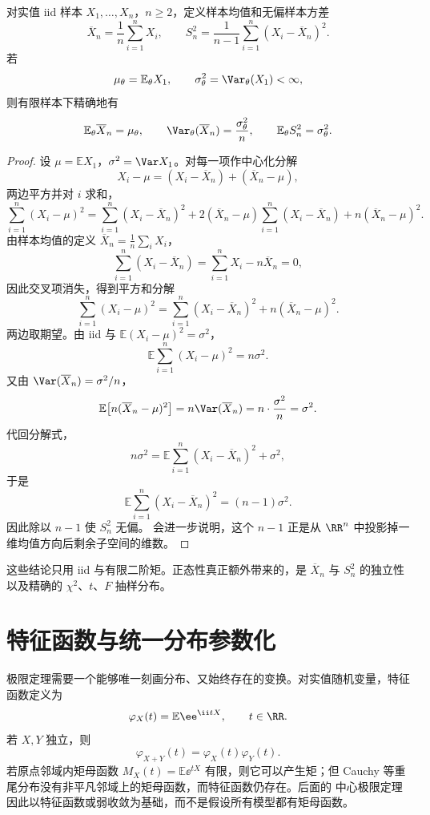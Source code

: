 \begin{proposition}[有限二阶矩下的样本矩无偏性]
对实值 iid 样本 $X_1,\ldots,X_n$，$n\ge2$，定义样本均值和无偏样本方差
\[
 \overline X_n=\frac1n\sum_{i=1}^nX_i,
 \qquad
 S_n^2=\frac1{n-1}\sum_{i=1}^n(X_i-\overline X_n)^2.
\]
若
\[
 \mu_\theta=\mathbb E_\theta X_1,
 \qquad
 \sigma_\theta^2=\Var_\theta(X_1)<\infty,
\]
则有限样本下精确地有
\[
 \mathbb E_\theta\overline X_n=\mu_\theta,
 \qquad
 \Var_\theta(\overline X_n)=\frac{\sigma_\theta^2}{n},
 \qquad
 \mathbb E_\theta S_n^2=\sigma_\theta^2.
\]

\end{proposition}
\begin{proof}
设 $\mu=\mathbb E X_1$，$\sigma^2=\Var X_1$。对每一项作中心化分解
\[
 X_i-\mu=(X_i-\overline X_n)+(\overline X_n-\mu),
\]
两边平方并对 $i$ 求和，
\[
 \sum_{i=1}^n(X_i-\mu)^2
 =\sum_{i=1}^n(X_i-\overline X_n)^2
 +2(\overline X_n-\mu)\sum_{i=1}^n(X_i-\overline X_n)
 +n(\overline X_n-\mu)^2.
\]
由样本均值的定义 $\overline X_n=\frac1n\sum_i X_i$，
\[
 \sum_{i=1}^n(X_i-\overline X_n)
 =\sum_{i=1}^n X_i-n\overline X_n
 =0,
\]
因此交叉项消失，得到平方和分解
\[
 \sum_{i=1}^n(X_i-\mu)^2
 =\sum_{i=1}^n(X_i-\overline X_n)^2
 +n(\overline X_n-\mu)^2.
\]
两边取期望。由 iid 与 $\mathbb E(X_i-\mu)^2=\sigma^2$，
\[
 \mathbb E\sum_{i=1}^n(X_i-\mu)^2
 =n\sigma^2.
\]
又由 $\Var(\overline X_n)=\sigma^2/n$，
\[
 \mathbb E\bigl[n(\overline X_n-\mu)^2\bigr]
 =n\Var(\overline X_n)
 =n\cdot\frac{\sigma^2}{n}
 =\sigma^2.
\]
代回分解式，
\[
 n\sigma^2
 =\mathbb E\sum_{i=1}^n(X_i-\overline X_n)^2+\sigma^2,
\]
于是
\[
 \mathbb E\sum_{i=1}^n(X_i-\overline X_n)^2
 =(n-1)\sigma^2.
\]
因此除以 $n-1$ 使 $S_n^2$ 无偏。 会进一步说明，这个 $n-1$ 正是从 $\RR^n$ 中投影掉一维均值方向后剩余子空间的维数。
\end{proof}
这些结论只用 iid 与有限二阶矩。正态性真正额外带来的，是 $\overline X_n$ 与 $S_n^2$ 的独立性以及精确的 $\chi^2$、$t$、$F$ 抽样分布。

\section{特征函数与统一分布参数化}

极限定理需要一个能够唯一刻画分布、又始终存在的变换。对实值随机变量，特征函数定义为
\[
 \varphi_X(t)=\mathbb E\ee^{\ii tX},
 \qquad t\in\RR.
\]
若 $X,Y$ 独立，则
\[
 \varphi_{X+Y}(t)=\varphi_X(t)\varphi_Y(t).
\]
若原点邻域内矩母函数 $M_X(t)=\mathbb E\ee^{tX}$ 有限，则它可以产生矩；但 Cauchy 等重尾分布没有非平凡邻域上的矩母函数，而特征函数仍存在。后面的 中心极限定理 因此以特征函数或弱收敛为基础，而不是假设所有模型都有矩母函数。

